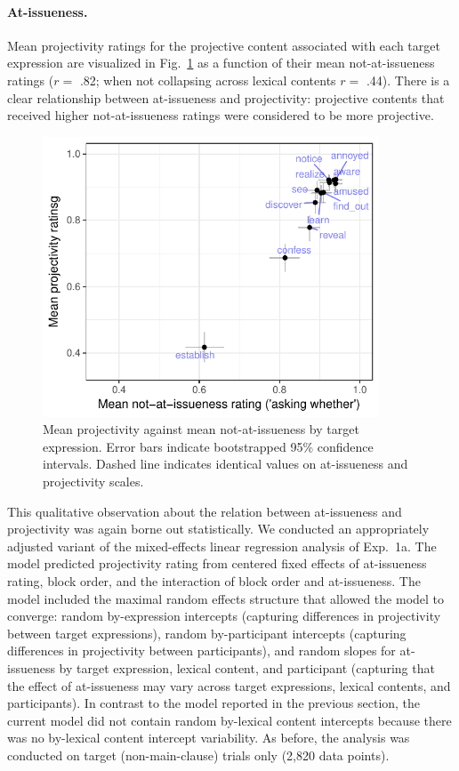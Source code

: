 \documentclass[11pt,fleqn]{article}
\newcommand{\6}{\mbox{$[\hspace*{-.6mm}[$}}
\newcommand{\9}{\mbox{$]\hspace*{-.6mm}]$}}
\newcommand{\figref}[1]{Fig.~\ref{#1}}
\begin{document}
\paragraph{At-issueness.} Mean projectivity ratings for the projective content associated with each target expression are visualized in \figref{fig:f-proj-ai-1b} as a function of their mean not-at-issueness ratings ($r =$ .82; when not collapsing across lexical contents $r =$ .44). There is a clear relationship between at-issueness and projectivity: projective contents that received higher not-at-issueness ratings were considered to be more projective.

\begin{figure}[!h]

\begin{center}
\includegraphics[width=10cm]{../results/exp1b/graphs/ai-proj-bytrigger-labels}
\end{center}

\caption{Mean projectivity against mean not-at-issueness by target expression. Error bars indicate bootstrapped 95\% confidence intervals. Dashed line indicates identical values on at-issueness and projectivity scales.}
\label{fig:f-proj-ai-1b}
\end{figure}

This qualitative observation about the relation between at-issueness and projectivity was again borne out statistically. We conducted an appropriately adjusted variant of the mixed-effects linear regression analysis of Exp.~1a. The model predicted projectivity rating from centered fixed effects of at-issueness rating, block order, and the interaction of block order and at-issueness. The model included the maximal random effects structure that allowed the model to converge: random by-expression intercepts (capturing differences in projectivity between target expressions),  random by-participant intercepts (capturing differences in projectivity between participants), and random slopes for at-issueness by target expression, lexical content, and participant (capturing that the effect of at-issueness may vary across target expressions, lexical contents, and participants). In contrast to the model reported in the previous section, the current model did not contain random by-lexical content intercepts because there was no by-lexical content intercept variability. As before, the analysis was conducted on target (non-main-clause) trials only (2,820 data points).
\end{document}
